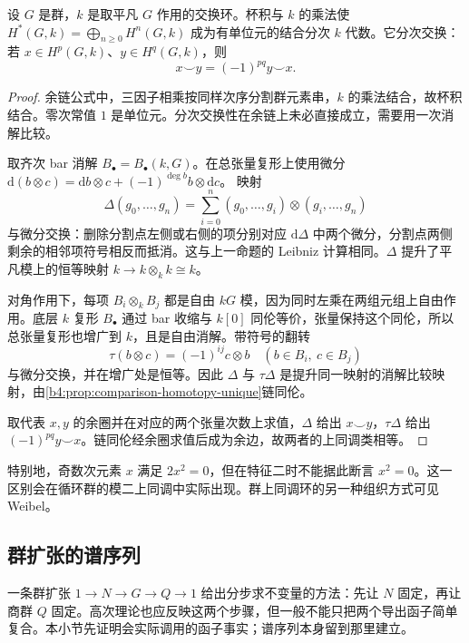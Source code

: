 \begin{theorem}[群上同调环]\label{b4:thm:group-cohomology-ring}
设 \(G\) 是群，\(k\) 是取平凡 \(G\) 作用的交换环。杯积与 \(k\) 的乘法使
\(H^*(G,k)=\bigoplus_{n\ge0}H^n(G,k)\)
成为有单位元的结合分次 \(k\) 代数。它分次交换：若 \(x\in H^p(G,k)\)、\(y\in H^q(G,k)\)，则
\[
x\smile y=(-1)^{pq}y\smile x.
\]
\end{theorem}
\begin{proof}
余链公式中，三因子相乘按同样次序分割群元素串，\(k\) 的乘法结合，故杯积结合。零次常值 \(1\) 是单位元。分次交换性在余链上未必直接成立，需要用一次消解比较。

取齐次 bar 消解 \(B_\bullet=B_\bullet(k,G)\)。在总张量复形上使用微分
\(\mathrm{d}(b\otimes c)=\mathrm{d}b\otimes c+(-1)^{\deg b}b\otimes \mathrm{d}c\)。
映射
\[
\Delta(g_0,\ldots,g_n)
=\sum_{i=0}^n(g_0,\ldots,g_i)\otimes(g_i,\ldots,g_n)
\]
与微分交换：删除分割点左侧或右侧的项分别对应 \(\mathrm{d}\Delta\) 中两个微分，分割点两侧剩余的相邻项符号相反而抵消。这与上一命题的 Leibniz 计算相同。\(\Delta\) 提升了平凡模上的恒等映射 \(k\to k\otimes_k k\cong k\)。

对角作用下，每项 \(B_i\otimes_kB_j\) 都是自由 \(kG\) 模，因为同时左乘在两组元组上自由作用。底层 \(k\) 复形 \(B_\bullet\) 通过 bar 收缩与 \(k[0]\) 同伦等价，张量保持这个同伦，所以总张量复形也增广到 \(k\)，且是自由消解。带符号的翻转
\[
\tau(b\otimes c)=(-1)^{ij}c\otimes b
\quad(b\in B_i,\ c\in B_j)
\]
与微分交换，并在增广处是恒等。因此 \(\Delta\) 与 \(\tau\Delta\) 是提升同一映射的消解比较映射，由\cref{b4:prop:comparison-homotopy-unique}链同伦。

取代表 \(x,y\) 的余圈并在对应的两个张量次数上求值，\(\Delta\) 给出 \(x\smile y\)，\(\tau\Delta\) 给出 \((-1)^{pq}y\smile x\)。链同伦经余圈求值后成为余边，故两者的上同调类相等。
\end{proof}

特别地，奇数次元素 \(x\) 满足 \(2x^2=0\)，但在特征二时不能据此断言 \(x^2=0\)。这一区别会在循环群的模二上同调中实际出现。群上同调环的另一种组织方式可见 Weibel\cite[Section 6.7.1, Theorem 6.7.11, Lemma 6.7.12]{Weibel1994HomologicalAlgebra}。

\subsection{群扩张的谱序列}
\label{b4:subsec:1104:02}

一条群扩张 \(1\to N\to G\to Q\to1\) 给出分步求不变量的方法：先让 \(N\) 固定，再让商群 \(Q\) 固定。高次理论也应反映这两个步骤，但一般不能只把两个导出函子简单复合。本小节先证明会实际调用的函子事实；谱序列本身留到那里建立。

